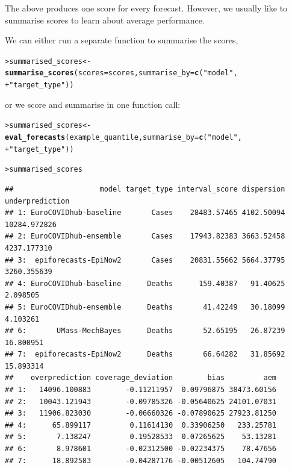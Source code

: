 \documentclass[article,shortnames]{jss}\usepackage[]{graphicx}\usepackage[]{color}
\makeatletter
\newcommand{\hlstr}[1]{\textcolor[rgb]{0.192,0.494,0.8}{#1}}%
\newcommand{\hlstd}[1]{\textcolor[rgb]{0.345,0.345,0.345}{#1}}%
\newcommand{\hlkwb}[1]{\textcolor[rgb]{0.69,0.353,0.396}{#1}}%
\newcommand{\hlkwc}[1]{\textcolor[rgb]{0.333,0.667,0.333}{#1}}%
\newcommand{\hlkwd}[1]{\textcolor[rgb]{0.737,0.353,0.396}{\textbf{#1}}}%
\newenvironment{kframe}{%
 \def\at@end@of@kframe{}%
 \ifinner\ifhmode%
  \def\at@end@of@kframe{\end{minipage}}%
  \begin{minipage}{\columnwidth}%
 \fi\fi%
 \def\FrameCommand##1{\hskip\@totalleftmargin \hskip-\fboxsep
 \colorbox{shadecolor}{##1}\hskip-\fboxsep
     \hskip-\linewidth \hskip-\@totalleftmargin \hskip\columnwidth}%
 \MakeFramed {\advance\hsize-\width
   \@totalleftmargin\z@ \linewidth\hsize
   \@setminipage}}%
 {\par\unskip\endMakeFramed%
 \at@end@of@kframe}
\newenvironment{knitrout}{}{} %
\makeatother
\begin{document}
The above produces one score for every forecast. However, we usually like to summarise scores to learn about average performance. 

We can either run a separate function to summarise the scores, 
\begin{knitrout}
\color{fgcolor}\begin{kframe}
\begin{alltt}
\hlstd{> }\hlstd{summarised_scores} \hlkwb{<-} \hlkwd{summarise_scores}\hlstd{(}\hlkwc{scores} \hlstd{= scores,} \hlkwc{summarise_by} \hlstd{=} \hlkwd{c}\hlstd{(}\hlstr{"model"}\hlstd{,}
\hlstd{+ }    \hlstr{"target_type"}\hlstd{))}
\end{alltt}
\end{kframe}
\end{knitrout}

or we score and summarise in one function call: 

\begin{knitrout}
\color{fgcolor}\begin{kframe}
\begin{alltt}
\hlstd{> }\hlstd{summarised_scores} \hlkwb{<-} \hlkwd{eval_forecasts}\hlstd{(example_quantile,} \hlkwc{summarise_by} \hlstd{=} \hlkwd{c}\hlstd{(}\hlstr{"model"}\hlstd{,}
\hlstd{+ }    \hlstr{"target_type"}\hlstd{))}
\end{alltt}
\end{kframe}
\end{knitrout}

\begin{knitrout}
\color{fgcolor}\begin{kframe}
\begin{alltt}
\hlstd{> }\hlstd{summarised_scores}
\end{alltt}
\begin{verbatim}
##                    model target_type interval_score dispersion underprediction
## 1: EuroCOVIDhub-baseline       Cases    28483.57465 4102.50094    10284.972826
## 2: EuroCOVIDhub-ensemble       Cases    17943.82383 3663.52458     4237.177310
## 3:  epiforecasts-EpiNow2       Cases    20831.55662 5664.37795     3260.355639
## 4: EuroCOVIDhub-baseline      Deaths      159.40387   91.40625        2.098505
## 5: EuroCOVIDhub-ensemble      Deaths       41.42249   30.18099        4.103261
## 6:       UMass-MechBayes      Deaths       52.65195   26.87239       16.800951
## 7:  epiforecasts-EpiNow2      Deaths       66.64282   31.85692       15.893314
##    overprediction coverage_deviation        bias         aem
## 1:   14096.100883        -0.11211957  0.09796875 38473.60156
## 2:   10043.121943        -0.09785326 -0.05640625 24101.07031
## 3:   11906.823030        -0.06660326 -0.07890625 27923.81250
## 4:      65.899117         0.11614130  0.33906250   233.25781
## 5:       7.138247         0.19528533  0.07265625    53.13281
## 6:       8.978601        -0.02312500 -0.02234375    78.47656
## 7:      18.892583        -0.04287176 -0.00512605   104.74790
\end{verbatim}
\end{kframe}
\end{knitrout}
\end{document}
